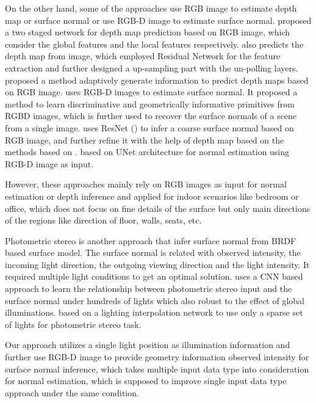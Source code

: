 On the other hand, some of the approaches use RGB image to estimate depth map or surface normal or use RGB-D image to estimate surface normal. 
\cite{Eigen} proposed a two staged network for depth map prediction based on RGB image, which consider the global features and the local features respectively. \cite{img2depth} also predicts the depth map from image, which employed Residual Network for the feature extraction and further designed a up-sampling part with the un-polling layers. 
\cite{binsformer} proposed a method adaptively generate information to predict depth maps based on RGB image. 
\cite{geometry_based_solution} uses RGB-D images to estimate surface normal. It proposed a method to learn discriminative and geometrically informative primitives from RGBD images, which is further used to recover the surface normals of a scene from a single image. 
\cite{GeoNet} uses ResNet (\cite{resnet}) to infer a coarse surface normal based on RGB image, and further refine it with the help of depth map based on the methods based on \cite{geometry_based_solution}. 
\cite{hfm} based on UNet architecture for normal estimation using RGB-D image as input. 

However, these approaches mainly rely on RGB images as input for normal estimation or depth inference and applied for indoor scenarios like bedroom or office, which does not focus on fine details of the surface but only main directions of the regions like direction of floor, walls, seats, etc.


Photometric stereo is another approach that infer surface normal from BRDF based surface model. The surface normal is related with observed intensity, the incoming light direction, the outgoing viewing direction and the light intensity. It required multiple light conditions to get an optimal solution. \cite{CNN-PS} uses a CNN based approach to learn the relationship between photometric stereo input and the surface normal under hundreds of lights which also robust to the effect of global illuminations. \cite{spline-net} based on a lighting interpolation network to use only a sparse set of lights for photometric stereo task.


Our approach utilizes a single light position as illumination information and further use RGB-D image to provide geometry information observed intensity for surface normal inference, which takes multiple input data type into consideration for normal estimation, which is supposed to improve single input data type approach under the same condition.





